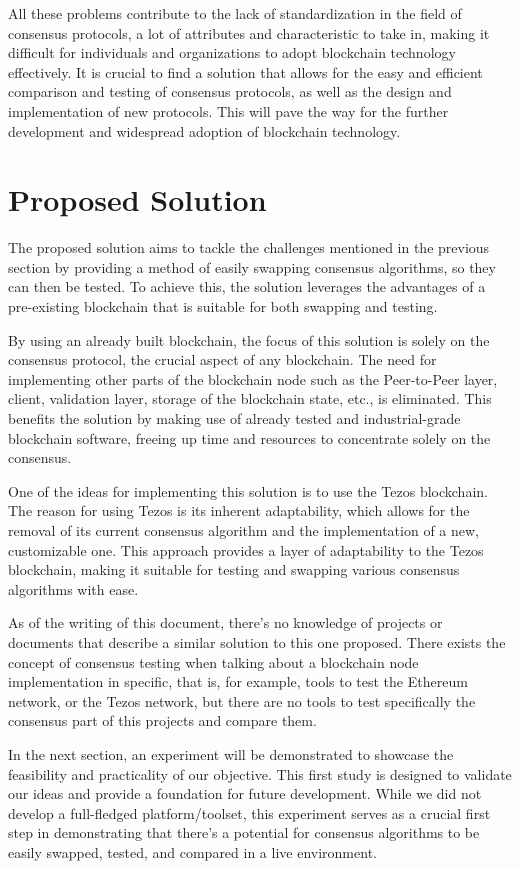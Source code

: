 All these problems contribute to the lack of standardization in the field of consensus protocols, a lot of attributes and characteristic to take in, making it difficult for individuals and organizations to adopt blockchain technology effectively.
It is crucial to find a solution that allows for the easy and efficient comparison and testing of consensus protocols, as well as the design and implementation of new protocols. This will pave the way for the further development and widespread adoption of blockchain technology.


\section{Proposed Solution}
The proposed solution aims to tackle the challenges mentioned in the previous section by providing a method of easily swapping consensus algorithms, so they can then be tested. To achieve this, the solution leverages the advantages of a pre-existing blockchain that is suitable for both swapping and testing.

By using an already built blockchain, the focus of this solution is solely on the consensus protocol, the crucial aspect of any blockchain. The need for implementing other parts of the blockchain node such as the Peer-to-Peer layer, client, validation layer, storage of the blockchain state, etc., is eliminated. This benefits the solution by making use of already tested and industrial-grade blockchain software, freeing up time and resources to concentrate solely on the consensus.

One of the ideas for implementing this solution is to use the Tezos blockchain. The reason for using Tezos is its inherent adaptability, which allows for the removal of its current consensus algorithm and the implementation of a new, customizable one. This approach provides a layer of adaptability to the Tezos blockchain, making it suitable for testing and swapping various consensus algorithms with ease.

As of the writing of this document, there's no knowledge of projects or documents that describe a similar solution to this one proposed. There exists the concept of consensus testing when talking about a blockchain node implementation in specific, that is, for example, tools to test the Ethereum network, or the Tezos network, but there are no tools to test specifically the consensus part of this projects and compare them.

In the next section, an experiment will be demonstrated to showcase the feasibility and practicality of our objective. This first study is designed to validate our ideas and provide a foundation for future development. While we did not develop a full-fledged platform/toolset, this experiment serves as a crucial first step in demonstrating that there's a potential for consensus algorithms to be easily swapped, tested, and compared in a live environment.

